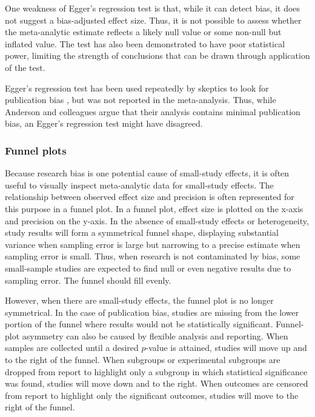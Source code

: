 \documentclass[man]{apa6}
\begin{document}
One weakness of Egger's regression test is that, while it can detect bias, it does not suggest a bias-adjusted effect size. Thus, it is not possible to assess whether the meta-analytic estimate reflects a likely null value or some non-null but inflated value. The test has also been demonstrated to have poor statistical power, limiting the strength of conclusions that can be drawn through application of the test. %

Egger's regression test has been used repeatedly by skeptics to look for publication bias \citep[e.g.,][]{Ferguson:2007,Ferguson:Kilburn:2009}, but was not reported in the \citet{Anderson:etal:2010} meta-analysis. Thus, while Anderson and colleagues argue that their analysis contains minimal publication bias, an Egger's regression test might have disagreed.

\subsubsection{Funnel plots}
Because research bias is one potential cause of small-study effects, it is often useful to visually inspect meta-analytic data for small-study effects. The relationship between observed effect size and precision is often represented for this purpose in a funnel plot. In a funnel plot, effect size is plotted on the x-axis and precision on the y-axis. In the absence of small-study effects or heterogeneity, study results will form a symmetrical funnel shape, displaying substantial variance when sampling error is large but narrowing to a precise estimate when sampling error is small. Thus, when research is not contaminated by bias, some small-sample studies are expected to find null or even negative results due to sampling error. The funnel should fill evenly.

However, when there are small-study effects, the funnel plot is no longer symmetrical. In the case of publication bias, studies are missing from the lower portion of the funnel where results would not be statistically significant. Funnel-plot asymmetry can also be caused by flexible analysis and reporting. When samples are collected until a desired $p$-value is attained, studies will move up and to the right of the funnel. When subgroups or experimental subgroups are dropped from report to highlight only a subgroup in which statistical significance was found, studies will move down and to the right. When outcomes are censored from report to highlight only the significant outcomes, studies will move to the right of the funnel.
\end{document}

